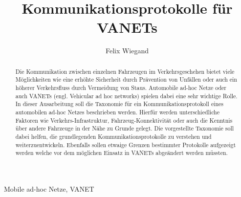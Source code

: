 \documentclass[english,runningheads,a4paper]{llncs}[2018/03/10]
\begin{document}
\title{Kommunikationsprotokolle für VANETs}

\author{Felix Wiegand}

%
%

\maketitle

\begin{abstract}
  Die Kommunikation zwischen einzelnen Fahrzeugen im Verkehrsgeschehen bietet viele Möglichkeiten wie eine erhöhte Sicherheit durch Prävention von Unfällen oder auch ein höherer Verkehrsfluss durch Vermeidung von Staus.
  Automobile ad-hoc Netze oder auch VANETs (engl. Vehicular ad hoc networks) spielen dabei eine sehr wichtige Rolle.
  In dieser Ausarbeitung soll die Taxonomie für ein Kommunikationsprotokoll eines automobilen ad-hoc Netzes beschrieben werden.
  Hierfür werden unterschiedliche Faktoren wie Verkehrs-Infrastruktur, Fahrzeug-Konnektivität oder auch die Kenntnis über andere Fahrzeuge in der Nähe zu Grunde gelegt.
  Die vorgestellte Taxonomie soll dabei helfen, die grundlegenden Kommunikationsprotokolle zu verstehen und weiterzuentwickeln.
  Ebenfalls sollen etwaige Grenzen bestimmter Protokolle aufgezeigt werden welche vor dem möglichen Einsatz in VANETs abgeändert werden müssten\cite{conti2013mobile}.
\end{abstract}

\begin{keywords}
  Mobile ad-hoc Netze, VANET
\end{keywords}
\end{document}

